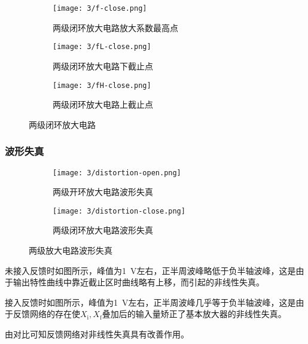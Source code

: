 \begin{figure}[H]
	\centering
	\begin{subfigure}[H]{.8\linewidth}
		\centering
		\texttt{[image: 3/f-close.png]}
		\caption{两级闭环放大电路放大系数最高点}
		\label{fig:两级闭环放大电路放大系数最高点}
	\end{subfigure}
	\quad
	\begin{subfigure}[H]{.8\linewidth}
		\centering
		\texttt{[image: 3/fL-close.png]}
		\caption{两级闭环放大电路下截止点}
		\label{fig:两级闭环放大电路下截止点}
	\end{subfigure}
	\quad
	\begin{subfigure}[H]{.8\linewidth}
		\centering
		\texttt{[image: 3/fH-close.png]}
		\caption{两级闭环放大电路上截止点}
		\label{fig:两级闭环放大电路上截止点}
	\end{subfigure}
	\caption{两级闭环放大电路}
	\label{fig:两级闭环放大电路}
\end{figure}

\subsubsection{波形失真}%
\label{ssub:波形失真}

\begin{figure}[H]
	\centering
	\begin{subfigure}[H]{.7\linewidth}
		\centering
		\texttt{[image: 3/distortion-open.png]}
		\caption{两级开环放大电路波形失真}
		\label{fig:两级开环放大电路波形失真}
	\end{subfigure}
	\quad
	\begin{subfigure}[H]{.7\linewidth}
		\centering
		\texttt{[image: 3/distortion-close.png]}
		\caption{两级闭环放大电路波形失真}
		\label{fig:两级闭环放大电路波形失真}
	\end{subfigure}
	\caption{两级放大电路波形失真}
	\label{fig:两级放大电路波形失真}
\end{figure}

未接入反馈时如图所示，峰值为\SI{1}{\V}左右，正半周波峰略低于负半轴波峰，这是由于输出特性曲线中靠近截止区时曲线略有上移，而引起的非线性失真。

接入反馈时如图所示，峰值为\SI{1}{\V}左右，正半周波峰几乎等于负半轴波峰，这是由于反馈网络的存在使$ X_\mathrm{i},X_\mathrm{f} $叠加后的输入量矫正了基本放大器的非线性失真。

由对比可知反馈网络对非线性失真具有改善作用。

